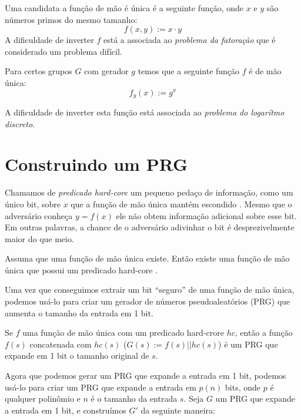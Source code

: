 \begin{example}
  Uma candidata a função de mão é única é a seguinte função, onde $x$ e $y$ são números primos do mesmo tamanho:
  \begin{displaymath}
    f(x,y) := x \cdot y
  \end{displaymath}
  A dificuldade de inverter $f$ está a associada ao {\em problema da fatoração} que é considerado um problema difícil.

  Para certos grupos $G$ com gerador $g$ temos que a seguinte função $f$ é de mão única:
  \begin{displaymath}
    f_g(x) := g^x
  \end{displaymath}

A dificuldade de inverter esta função está associada ao {\em problema do logarítmo discreto}.
\end{example}

\section{Construindo um PRG}

Chamamos de {\em predicado hard-core} um pequeno pedaço de informação, como um único bit, sobre $x$ que a função de mão única mantém escondido \cite{Blum84}.
Mesmo que o adversário conheça $y = f(x)$ ele não obtem informação adicional sobre esse bit.
Em outras palavras, a chance de o adversário adivinhar o bit é desprezivelmente maior do que meio.

\begin{theorem}
  Assuma que uma função de mão única existe.
  Então existe uma função de mão única que possui um predicado hard-core \cite{Goldreich89}.
\end{theorem}

Uma vez que conseguimos extrair um bit ``seguro'' de uma função de mão única, podemos usá-lo para criar um gerador de números pseudoaleatórios (PRG) que aumenta o tamanho da entrada em 1 bit.

\begin{theorem}
  Se $f$ uma função de mão única com um predicado hard-crore $hc$, então a função $f(s)$ concatenada com $hc(s)$ ($G(s) := f(s)||hc(s)$) é um PRG que expande em 1 bit o tamanho original de $s$.
\end{theorem}

Agora que podemos gerar um PRG que expande a entrada em 1 bit, podemos usá-lo para criar um PRG que expande a entrada em $p(n)$ bits, onde $p$ é qualquer polinômio e $n$ é o tamanho da entrada $s$.
Seja $G$ um PRG que expande a entrada em 1 bit, e construímos $G'$ da seguinte maneira:

